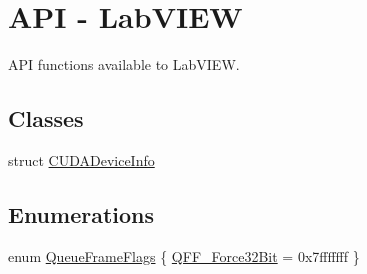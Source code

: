 \hypertarget{group__lab___a_p_i}{}\section{A\+PI -\/ Lab\+V\+I\+EW}
\label{group__lab___a_p_i}


A\+PI functions available to Lab\+V\+I\+EW.  


\subsection*{Classes}
\begin{DoxyCompactItemize}
\item 
struct \hyperlink{struct_c_u_d_a_device_info}{C\+U\+D\+A\+Device\+Info}
\end{DoxyCompactItemize}
\subsection*{Enumerations}
\begin{DoxyCompactItemize}
\item 
enum \hyperlink{group__lab___a_p_i_gafd9ebd216f1dd2994e68fa672feaaa41}{Queue\+Frame\+Flags} \{ \hyperlink{group__lab___a_p_i_ggafd9ebd216f1dd2994e68fa672feaaa41a5af6f36a4614e54484ce400b403bb8c8}{Q\+F\+F\+\_\+\+Force32\+Bit} = 0x7fffffff
 \}
\end{DoxyCompactItemize}
